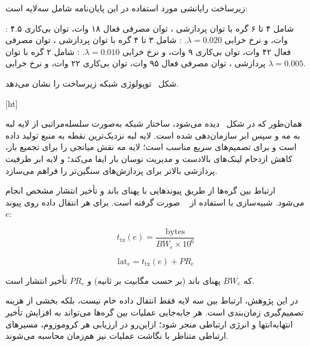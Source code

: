 

زیرساخت رایانشی مورد استفاده در این پایان‌نامه شامل سه‌لایه است:

 : شامل ۴ تا ۶ گره با توان پردازشی ،
توان مصرفی فعال ۱۸ وات، توان بی‌کاری ۴.۵ وات، و نرخ خرابی $\lambda = 0.020$.
 : شامل ۳ تا ۴ گره با توان پردازشی ،
توان مصرفی فعال ۴۲ وات، توان بی‌کاری ۹ وات، و نرخ خرابی $\lambda = 0.010$.
 : شامل ۲ گره با توان پردازشی ،
توان مصرفی فعال ۹۵ وات، توان بی‌کاری ۲۲ وات، و نرخ خرابی $\lambda = 0.005$.

شکل~ توپولوژی شبکه زیرساخت را نشان می‌دهد.

[ht]

همان‌طور که در شکل~ دیده می‌شود، ساختار شبکه به‌صورت سلسله‌مراتبی
از لایه لبه به مه و سپس ابر سازمان‌دهی شده است. لایه لبه نزدیک‌ترین نقطه به منبع تولید داده است
و برای تصمیم‌های سریع مناسب است؛ لایه مه نقش میانجی را برای تجمیع بار، کاهش ازدحام لینک‌های بالادست
و مدیریت نوسان بار ایفا می‌کند؛ و لایه ابر ظرفیت پردازشی بالاتر برای پردازش‌های سنگین‌تر را فراهم می‌سازد.



ارتباط بین گره‌ها از طریق پیوندهایی با پهنای باند و تأخیر انتشار مشخص انجام می‌شود.
شبیه‌سازی با استفاده از ~\cite{lera2019yafs} صورت گرفته است.
برای هر انتقال داده روی پیوند $e$:

\begin{equation}
t_{\text{tx}}(e) = \frac{\text{bytes}}{BW_e \times 10^6}
\end{equation}

\begin{equation}
\text{lat}_e = t_{\text{tx}}(e) + PR_e
\end{equation}

که $BW_e$ پهنای باند (بر حسب مگابیت بر ثانیه) و $PR_e$ تأخیر انتشار است.

در این پژوهش، ارتباط بین سه لایه فقط انتقال داده خام نیست، بلکه بخشی از هزینه تصمیم‌گیری زمان‌بندی است.
هر جابه‌جایی عملیات بین گره‌ها می‌تواند به افزایش تأخیر انتهابه‌انتها و انرژی ارتباطی منجر شود؛
ازاین‌رو در ارزیابی هر کروموزوم، مسیرهای ارتباطی متناظر با نگاشت عملیات نیز هم‌زمان محاسبه می‌شوند.

